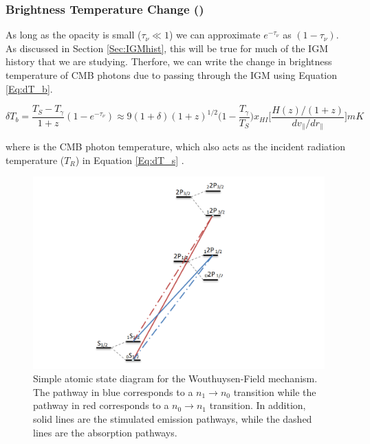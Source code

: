 \subsubsection{Brightness Temperature Change (\dtb)}
As long as the opacity is small ($\tau_\nu \ll 1$) we can approximate $e^{-\tau_\nu}$ as $(1-\tau_\nu)$. As discussed in Section \ref{Sec:IGMhist}, this will be true for much of the IGM history that we are studying. Therfore, we can write the change in brightness temperature of CMB photons due to passing through the IGM using Equation \ref{Eq:dT_b}.

\begin{equation}\label{Eq:dT_b}
\delta T_b = \frac{T_S - T_\gamma}{1+z}(1-e^{-\tau_\nu}) \approx 9 (1+\delta) (1+z)^{1/2} \Big(1-\frac{T_\gamma}{T_S}\Big) x_{HI} \Big[ \frac{H(z)/(1+z)}{dv_{\parallel}/dr_{\parallel}} \Big] mK
\end{equation}

where \tg is the CMB photon temperature, which also acts as the incident radiation temperature ($T_R$) in Equation \ref{Eq:dT_s} \cite{furlanetto_2006}. 


\begin{figure}[htb]
\begin{center}
\includegraphics[width=0.95\linewidth]{Introduction/figures/wfm_states.png}
\caption{Simple atomic state diagram for the Wouthuysen-Field mechanism. The pathway in blue corresponds to a $n_1 \rightarrow n_0$ transition while the pathway in red corresponds to a $n_0 \rightarrow n_1$ transition. In addition, solid lines are the stimulated emission pathways, while the dashed lines are the absorption pathways.}
\label{Fig:wfm_states}
\end{center}
\end{figure}

